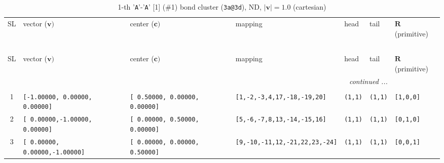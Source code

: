 \documentclass[fleqn,10pt,landscape]{jsarticle}
\begin{document}
\renewcommand{\arraystretch}{1.6}
\begin{longtable}[l]{cllllll}
\captionsetup{justification=raggedright, singlelinecheck=off}
\caption{1-th '\texttt{A}'-'\texttt{A}' [1] (\#1) bond cluster (\texttt{3a@3d}), ND, $|\bm{v}|=1.0$ (cartesian)}
 \\
 \hline \hline
SL & vector ($\bm{v})$ & center ($\bm{c})$ & mapping & head & tail & $\bm{R}$ (primitive) \\ \hline \endfirsthead

\multicolumn{6}{l}{\tablename\ \thetable{}} \\
 \hline \hline
SL & vector ($\bm{v})$ & center ($\bm{c})$ & mapping & head & tail & $\bm{R}$ (primitive) \\ \hline \endhead

 \hline \hline
\multicolumn{6}{r}{\footnotesize\it continued ...} \\ \endfoot

 \hline \hline
\multicolumn{6}{r}{} \\ \endlastfoot

1 & \texttt{[-1.00000, 0.00000, 0.00000]} & \texttt{[ 0.50000, 0.00000, 0.00000]} & \texttt{[1,-2,-3,4,17,-18,-19,20]} & \texttt{(1,1)} & \texttt{(1,1)} & \texttt{[1,0,0]} \\ \hline
2 & \texttt{[ 0.00000,-1.00000, 0.00000]} & \texttt{[ 0.00000, 0.50000, 0.00000]} & \texttt{[5,-6,-7,8,13,-14,-15,16]} & \texttt{(1,1)} & \texttt{(1,1)} & \texttt{[0,1,0]} \\ \hline
3 & \texttt{[ 0.00000, 0.00000,-1.00000]} & \texttt{[ 0.00000, 0.00000, 0.50000]} & \texttt{[9,-10,-11,12,-21,22,23,-24]} & \texttt{(1,1)} & \texttt{(1,1)} & \texttt{[0,0,1]} \\
\end{longtable}
\renewcommand{\arraystretch}{1.6}
\end{document}
